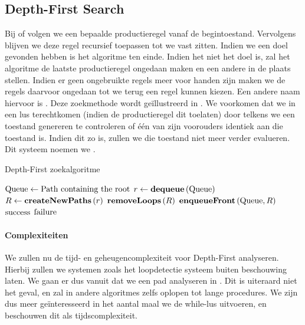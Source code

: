 \subsection{Depth-First Search}
Bij  of  volgen we een bepaalde productieregel vanaf de begintoestand. Vervolgens blijven we deze regel recursief toepassen tot we vast zitten. Indien we een doel gevonden hebben is het algoritme ten einde. Indien het niet het doel is, zal het algoritme de laatste productieregel ongedaan maken en een andere in de plaats stellen. Indien er geen ongebruikte regels meer voor handen zijn maken we de regels daarvoor ongedaan tot we terug een regel kunnen kiezen. Een andere naam hiervoor is . Deze zoekmethode wordt ge\"illustreerd in . We voorkomen dat we in een lus terechtkomen (indien de productieregel dit toelaten) door telkens we een toestand genereren te controleren of \'e\'en van zijn voorouders identiek aan die toestand is. Indien dit zo is, zullen we die toestand niet meer verder evalueren. Dit systeem noemen we .
\begin{algorithm}[htb]                      %
\caption{Depth-First zoekalgoritme}          %
\label{alg:depthFirst}                           %
\begin{algorithmic}[1]                    %
\STATE $\mbox{Queue}\leftarrow\mbox{Path containing the root}$
\WHILE{$\notempty{\queue}\wedge\neg\goalreached{\queue}$}
\STATE $r\leftarrow\mbox{\bf dequeue}\left( \mbox{Queue} \right)$
\STATE $R\leftarrow\mbox{\bf createNewPaths}\left( r \right)$
\STATE $\mbox{\bf removeLoops}\left( R \right)$
\STATE $\mbox{\bf enqueueFront}\left( \mbox{Queue},R \right)$
\ENDWHILE
\IF{$\goalreached{\queue}$}
\RETURN $\mbox{success}$
\ELSE
\RETURN $\mbox{failure}$
\ENDIF
\end{algorithmic}
\end{algorithm}
\paragraph{Complexiteiten}
We zullen nu de tijd- en geheugencomplexiteit voor Depth-First analyseren. Hierbij zullen we systemen zoals het loopdetectie systeem buiten beschouwing laten. We gaan er dus vanuit dat we een pad analyseren in . Dit is uiteraard niet het geval, en zal in andere algoritmes zelfs oplopen tot lange procedures. We zijn dus meer ge\"interesseerd in het aantal maal we de while-lus uitvoeren, en beschouwen dit als tijdscomplexiteit. 
